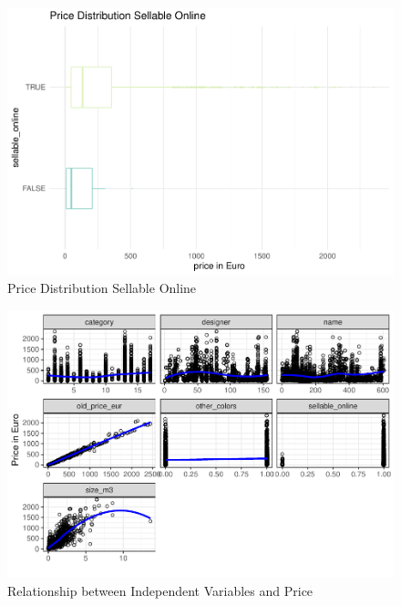 \documentclass[a4paper, nobind]{templates/ociamthesis}
\begin{document}
\begin{figure}[!h]
\includegraphics[width=1\linewidth]{_main_files/figure-latex/price-dist-sellable-online-1} \caption{Price Distribution Sellable Online}\label{fig:price-dist-sellable-online}
\end{figure}

\begin{figure}[!h]
\includegraphics[width=1\linewidth]{_main_files/figure-latex/relationship-x-y-1} \caption{Relationship between Independent Variables and Price}\label{fig:relationship-x-y}
\end{figure}
\end{document}
